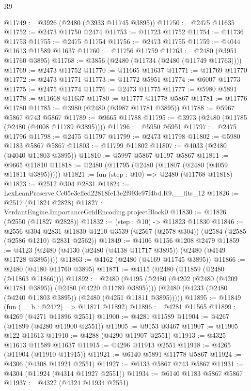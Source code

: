 \begin{lexlean}{R9}
\begin{coremodule}
@11749 := @3926 (@2480 (@3933 @11745 @3895))
@11750 := @2475 @11635
@11752 := @2473 @11750 @2474
@11753 := @11723 @11752
@11754 := @11736 @11753
@11755 := @2475 @11754
@11756 := @2473 @11755
@11759 := @4044 @11613 @11589 @11637
@11760 := @11756 @11759
@11763 := @2480 (@3951 @11760 @3895)
@11768 := @3856 (@2480 (@11734 (@2480 (@11749 @11763))))
@11769 := @2473 @11752
@11770 := @11665 @11637
@11771 := @11769 @11770
@11772 := @2473 @11771
@11773 := @11772 @5951
@11774 := @6007 @11773
@11775 := @2475 @11774
@11776 := @2473 @11775
@11777 := @5980 @5891
@11778 := @11668 @11637
@11780 := @11777 @11778 @5867
@11781 := @11776 @11780
@11785 := @3980 (@2480 (@3987 @11781 @3895))
@11788 := @5967 @5867 @743 @5867
@11789 := @9665 @11788
@11795 := @3973 (@2480 (@11785 (@2480 (@4008 @11789 @3895))))
@11796 := @5950 @5951
@11797 := @2475 @11796
@11798 := @2475 @11797
@11799 := @2473 @11798
@11802 := @5980 @1183 @5867 @5867
@11803 := @11799 @11802
@11807 := @4033 (@2480 (@4040 @11803 @3895))
@11810 := @5997 @5867 @1197 @5867
@11811 := @9665 @11810
@11818 := @2480 (@11795 (@2480 (@11807 (@2480 (@4059 @11811 @3895)))))
@11821 := fun (step : @10) => @2480 (@11768 @11818)
@11823 := @2512 @304 @2831
@11824 := LexLeanPreserve.Cc05e3effed22818fe13e2f993e97f4bd.R9.__fits_12
@11826 := @2517 (@11824 @2828)
@11827 := VerdantEngine.ImportanceGridEncoding.projectBlock0
@11830 := @11826 (@2550 (@11827 @2828))
@11832 := (step : @10) -> @11823 @11830
@11846 := @2556
    @304
    @2831
    @11830
    @1210
    @3539
    (@2567 (@2578 @304))
    (@2584 (@2585 (@2586 @1210) @2831 @2562))
@11849 := @4106 @1156 @1208 @2479
@11859 := @4123 (@2480 (@4130 (@2480 (@4138 @11717 @3895)) (@2480 (@4149 @11728 @3895))))
@11863 := @4162 (@2480 (@4169 @11745 @3895))
@11866 := @2480 (@4180 @11760 @3895)
@11871 := @4115 (@2480 (@11859 (@2480 (@11863 @11866))))
@11892 := @2480
    (@4195
      (@2480 (@4202 (@2480 (@4209 @11781 @3895)) (@2480 (@4220 @11789 @3895))))
      (@2480 (@4233 (@2480 (@4240 @11803 @3895)) (@2480 (@4251 @11811 @3895)))))
@11895 := @11849 (fun (__b : @2472) => @11871 @11892)
@11896 := @4281 @11565
@11899 := @4269 (@4271 @11896 @2551)
@11900 := @4281 @11589
@11904 := @4267 (@11899 (@4280 @11900 @2551))
@11905 := @9153 @3467
@11907 := @11905 @122 @11613
@11910 := @4288 (@4290 @11907 @2551)
@11913 := @4325 @11613 @11589 @11637
@11915 := @4296 @11913 @2551
@11918 := @4265 (@11904 (@11910 @11915))
@11921 := @6140 @5891 @11778 @5867
@11924 := @4306 (@4308 @11921 @2551)
@11927 := @6133 @5867 @743 @5867
@11931 := @4304 (@11924 (@4314 @11927 @2551))
@11934 := @6140 @1183 @5867 @5867
@11937 := @4322 (@4324 @11934 @2551)

\end{coremodule}
\end{lexlean}

